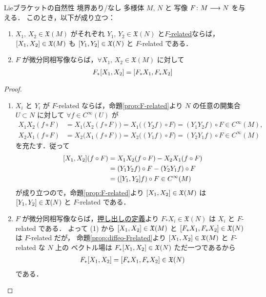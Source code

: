 \documentclass[geometry_main]{subfiles}
\begin{document}
\begin{myprop}[label=prop:Lie-bracket-natural]{Lieブラケットの自然性}
    境界あり/なし \cinfty 多様体 $M,\, N$ と \cinfty 写像 $F \colon M \longrightarrow N$ を与える．
    このとき，以下が成り立つ：
    \begin{enumerate}
        \item $X_1,\, X_2 \in \mathfrak{X}(M)$ がそれぞれ $Y_1,\, Y_2 \in \mathfrak{X}(N)$ と\hyperref[def:F-related]{$F$-related}ならば，
        $\comm{X_1}{X_2} \in \mathfrak{X}(M)$ も $\comm{Y_1}{Y_2} \in \mathfrak{X}(N)$ と $F$-related である．
        \item $F$ が微分同相写像ならば，$\forall X_1,\, X_2 \in \mathfrak{X}(M)$ に対して
        \begin{align}
            F_* \comm{X_1}{X_2} = \comm{F_* X_1}{F_* X_2}
        \end{align}
    \end{enumerate}
    
\end{myprop}

\begin{proof}
    \begin{enumerate}
        \item $X_i$ と $Y_i$ が $F$-related ならば，命題\ref{prop:F-related}より $N$ の任意の開集合 $U \subset N$ に対して $\forall f \in C^\infty (U)$ が
        \begin{align}
            X_1 X_2 (f \circ F) &= X_1 \bigl( X_2(f \circ F) \bigr) = X_1 \bigl( (Y_2f) \circ F \bigr) = (Y_1Y_2 f) \circ F \in C^\infty (M), \\
            X_2 X_1 (f \circ F) &= X_2 \bigl( X_1(f \circ F) \bigr) = X_2 \bigl( (Y_1f) \circ F \bigr) = (Y_2Y_1 f) \circ F \in C^\infty (M)
        \end{align}
        を充たす．従って
        \begin{align}
            \comm{X_1}{X_2}(f \circ F) &= X_1X_2(f \circ F) - X_2X_1(f \circ F) \\
            &= (Y_1Y_2 f) \circ F - (Y_2Y_1f) \circ F \\
            &= (\comm{Y_1}{Y_2} f) \circ F \in C^\infty (M)
        \end{align}
        が成り立つので，命題\ref{prop:F-related}より $\comm{X_1}{X_2} \in \mathfrak{X}(M)$ は $\comm{Y_1}{Y_2} \in \mathfrak{X}(N)$ と $F$-related である．
        \item $F$ が微分同相写像ならば，\hyperref[prop:diffeo-Frelated]{押し出しの定義}より $F_* X_i \in \mathfrak{X}(N)$ は $X_i$ と $F$-related である．
        よって (1) から $\comm{X_1}{X_2} \in \mathfrak{X}(M)$ と $\comm{F_* X_1}{F_* X_2} \in \mathfrak{X}(N)$ は $F$-related だが，
        命題\ref{prop:diffeo-Frelated}より $\comm{X_1}{X_2} \in \mathfrak{X}(M)$ と $F$-related な $N$ 上の \cinfty ベクトル場は $F_* \comm{X_1}{X_2} \in \mathfrak{X}(N)$ ただ一つであるから
        \begin{align}
            F_*\comm{X_1}{X_2} = \comm{F_* X_1}{F_* X_2} \in \mathfrak{X}(N)
        \end{align}
        である．
    \end{enumerate}
    
\end{proof}
\end{document}
